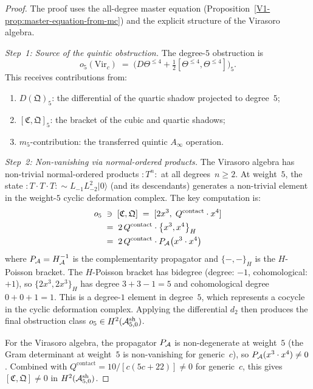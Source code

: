 \begin{proof}
The proof uses the all-degree master equation
(Proposition~\ref{V1-prop:master-equation-from-mc}) and the explicit
structure of the Virasoro algebra.

\medskip\noindent
\emph{Step~1: Source of the quintic obstruction.}\;
The degree-$5$ obstruction is
\begin{equation}%
o_5(\mathrm{Vir}_c)
\;=\;
\bigl(D\Theta^{\leq 4} + \tfrac{1}{2}
[\Theta^{\leq 4}, \Theta^{\leq 4}]\bigr)_5.
\end{equation}
This receives contributions from:
\begin{enumerate}[label=\textup{(\alph*)}]
\item $D(\mathfrak{Q})_5$: the differential of the quartic
 shadow projected to degree~$5$;
\item $[\mathfrak{C}, \mathfrak{Q}]_5$: the bracket of the cubic
 and quartic shadows;
\item $m_5$-contribution: the transferred quintic $A_\infty$
 operation.
\end{enumerate}

\medskip\noindent
\emph{Step~2: Non-vanishing via normal-ordered products.}\;
The Virasoro algebra has non-trivial normal-ordered products
$:T^n:$ at all degrees~$n \geq 2$. At weight~$5$, the state
$:T\cdot T\cdot T: \sim L_{-1}L_{-2}^2|0\rangle$ (and
its descendants) generates a non-trivial element in the
weight-$5$ cyclic deformation complex. The key computation is:
\begin{align}
o_5 &\;\ni\;
[\mathfrak{C}, \mathfrak{Q}]
\;=\;
[2x^3,\; Q^{\mathrm{contact}}\cdot x^4]
\notag \\
&\;=\;
2\,Q^{\mathrm{contact}}\cdot
\bigl\{x^3, x^4\bigr\}_H
\notag \\
&\;=\;
2\,Q^{\mathrm{contact}}\cdot
P_{\mathcal{A}}\bigl(x^3 \cdot x^4\bigr)
\end{align}
where $P_{\mathcal{A}} = H_{\mathcal{A}}^{-1}$ is the complementarity propagator and
$\{-, -\}_H$ is the $H$-Poisson bracket. The $H$-Poisson bracket
has bidegree (degree: $-1$, cohomological: $+1$), so
$\{2x^3, 2x^3\}_H$ has degree $3 + 3 - 1 = 5$ and cohomological
degree $0 + 0 + 1 = 1$. This is a degree-$1$ element in degree~$5$,
which represents a cocycle in the cyclic deformation complex.
Applying the differential $d_2$ then produces the final obstruction
class $o_5 \in H^2(\mathcal{A}^{\mathrm{sh}}_{5,0})$.

For the Virasoro algebra, the propagator $P_{\mathcal{A}}$ is non-degenerate
at weight~$5$ (the Gram determinant at weight~$5$ is non-vanishing
for generic~$c$), so
$P_{\mathcal{A}}(x^3 \cdot x^4) \neq 0$.
Combined with $Q^{\mathrm{contact}} = 10/[c(5c+22)] \neq 0$
for generic~$c$, this gives
$[\mathfrak{C}, \mathfrak{Q}] \neq 0$
in $H^2(\mathcal{A}^{\mathrm{sh}}_{5,0})$.


\end{proof}
